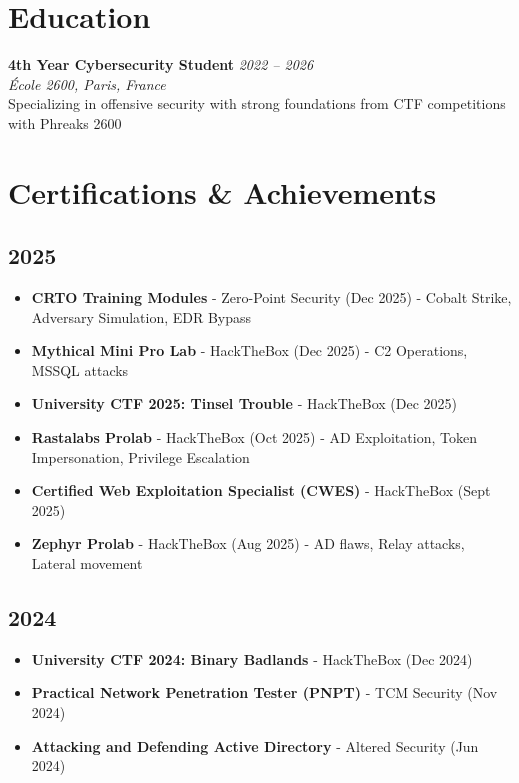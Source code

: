 \documentclass[11pt,a4paper]{article}
\begin{document}
\section{Education}

\textbf{4th Year Cybersecurity Student} \hfill \textit{2022 -- 2026} \\
\textit{École 2600, Paris, France} \\
Specializing in offensive security with strong foundations from CTF competitions with Phreaks 2600

\section{Certifications \& Achievements}

\subsection*{2025}
\begin{itemize}[leftmargin=*, noitemsep]
    \item \textbf{CRTO Training Modules} - Zero-Point Security (Dec 2025) - Cobalt Strike, Adversary Simulation, EDR Bypass
    \item \textbf{Mythical Mini Pro Lab} - HackTheBox (Dec 2025) - C2 Operations, MSSQL attacks
    \item \textbf{University CTF 2025: Tinsel Trouble} - HackTheBox (Dec 2025)
    \item \textbf{Rastalabs Prolab} - HackTheBox (Oct 2025) - AD Exploitation, Token Impersonation, Privilege Escalation
    \item \textbf{Certified Web Exploitation Specialist (CWES)} - HackTheBox (Sept 2025)
    \item \textbf{Zephyr Prolab} - HackTheBox (Aug 2025) - AD flaws, Relay attacks, Lateral movement
\end{itemize}

\subsection*{2024}
\begin{itemize}[leftmargin=*, noitemsep]
    \item \textbf{University CTF 2024: Binary Badlands} - HackTheBox (Dec 2024)
    \item \textbf{Practical Network Penetration Tester (PNPT)} - TCM Security (Nov 2024)
    \item \textbf{Attacking and Defending Active Directory} - Altered Security (Jun 2024)
\end{itemize}
\end{document}
